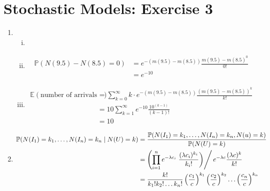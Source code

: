\documentclass[a4paper,10pt]{article}
\theoremstyle{definition}
\begin{document}
\section*{Stochastic Models: Exercise 3}

\begin{enumerate}
\item
\begin{enumerate}[(i)]
\item 
\item 
\begin{align*}
\mathbb{P}(N(9.5)-N(8.5)=0)&=e^{-(m(9.5)-m(8.5))}\frac{m(9.5)-m(8.5)^0}{0!}\\
&=e^{-10}
\end{align*}
\item 
\begin{align*}
\mathbb{E}(\text{number of arrivals from 8:30AM-9:30AM})&=\sum_{k=0}^{\infty}k\cdot e^{-(m(9.5)-m(8.5))}\frac{(m(9.5)-m(8.5))^k}{k!}\\
&=10\sum_{k=1}^{\infty} e^{-10}\frac{10^{(k-1)}}{(k-1)!}\\
&=10
\end{align*}
\end{enumerate}
\item 
\begin{align*}
\mathbb{P}(N(I_1)=k_1,\ldots,N(I_n)=k_n\mid N(U)=k)&=\frac{\mathbb{P}(N(I_1)=k_1,\ldots,N(I_n)=k_n,N(u)=k)}{\mathbb{P}(N(U)=k)}\\
&=\left(\prod_{i=1}^{n}e^{-\lambda c_i}\left.\frac{(\lambda c_i)^{k_i}}{k_i!}\right)\right/ e^{-\lambda c}\frac{(\lambda c)^k}{k!}\\
&=\frac{k!}{k_1!k_2!\ldots k_n!}\left(\frac{c_1}{c}\right)^{k_1}\left(\frac{c_2}{c}\right)^{k_2}\ldots\left(\frac{c_n}{c}\right)^{k_n}
\end{align*}


\end{enumerate}
\end{document}
